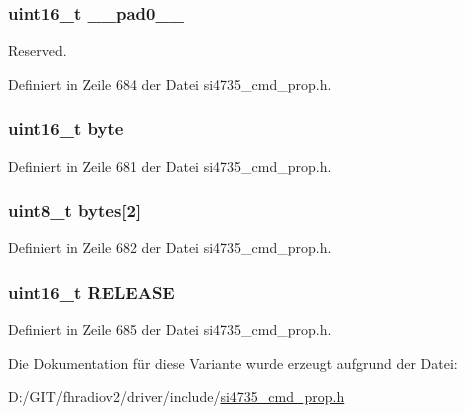 \subsubsection[{\+\_\+\+\_\+pad0\+\_\+\+\_\+}]{\setlength{\rightskip}{0pt plus 5cm}uint16\+\_\+t \+\_\+\+\_\+pad0\+\_\+\+\_\+}\label{unionfm__soft__mute__rel__rate_a77132c2c26a75f5b8751b235cda23828}


Reserved. 



Definiert in Zeile 684 der Datei si4735\+\_\+cmd\+\_\+prop.\+h.

\hypertarget{unionfm__soft__mute__rel__rate_ab0549c1b5ea980a02e7eab77e21fea49}{}
\subsubsection[{byte}]{\setlength{\rightskip}{0pt plus 5cm}uint16\+\_\+t byte}\label{unionfm__soft__mute__rel__rate_ab0549c1b5ea980a02e7eab77e21fea49}


Definiert in Zeile 681 der Datei si4735\+\_\+cmd\+\_\+prop.\+h.

\hypertarget{unionfm__soft__mute__rel__rate_a46e4c05d20a047ec169f60d3167e912e}{}
\subsubsection[{bytes}]{\setlength{\rightskip}{0pt plus 5cm}uint8\+\_\+t bytes\mbox{[}2\mbox{]}}\label{unionfm__soft__mute__rel__rate_a46e4c05d20a047ec169f60d3167e912e}


Definiert in Zeile 682 der Datei si4735\+\_\+cmd\+\_\+prop.\+h.

\hypertarget{unionfm__soft__mute__rel__rate_a11e93d50103a9c890a961d4571dae3b9}{}
\subsubsection[{R\+E\+L\+E\+A\+S\+E}]{\setlength{\rightskip}{0pt plus 5cm}uint16\+\_\+t R\+E\+L\+E\+A\+S\+E}\label{unionfm__soft__mute__rel__rate_a11e93d50103a9c890a961d4571dae3b9}


Definiert in Zeile 685 der Datei si4735\+\_\+cmd\+\_\+prop.\+h.



Die Dokumentation für diese Variante wurde erzeugt aufgrund der Datei\+:\begin{DoxyCompactItemize}
\item 
D\+:/\+G\+I\+T/fhradiov2/driver/include/\hyperlink{si4735__cmd__prop_8h}{si4735\+\_\+cmd\+\_\+prop.\+h}\end{DoxyCompactItemize}
